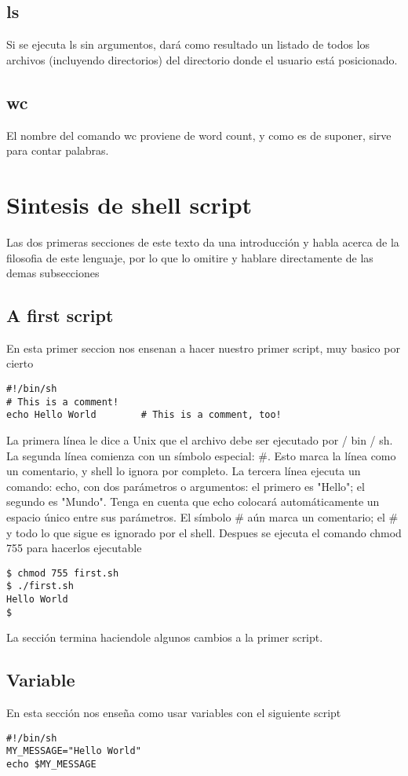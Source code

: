 \documentclass{article}
\begin{document}
\subsection{ls}
Si se ejecuta ls sin argumentos, dará como resultado un listado de todos los archivos (incluyendo directorios) del directorio donde el usuario está posicionado.
\subsection{wc}
El nombre del comando wc proviene de word count, y como es de suponer, sirve para contar palabras.


\section{Sintesis de shell script}
Las dos primeras secciones de este texto da una introducción y habla acerca de la filosofia de este lenguaje, por lo que lo omitire y hablare directamente de las demas subsecciones
\subsection{A first script}
En esta primer seccion nos ensenan a hacer nuestro primer script, muy basico por cierto
\begin{verbatim}
#!/bin/sh
# This is a comment!
echo Hello World        # This is a comment, too!
\end{verbatim}
La primera línea le dice a Unix que el archivo debe ser ejecutado por / bin / sh.
\newline
La segunda línea comienza con un símbolo especial: \#. Esto marca la línea como un comentario, y shell lo ignora por completo.
\newline
La tercera línea ejecuta un comando: echo, con dos parámetros o argumentos: el primero es "Hello"; el segundo es "Mundo".
Tenga en cuenta que echo colocará automáticamente un espacio único entre sus parámetros.
El símbolo \# aún marca un comentario; el \# y todo lo que sigue es ignorado por el shell.
\newline
Despues se ejecuta el comando chmod 755 para hacerlos ejecutable
\begin{verbatim}
$ chmod 755 first.sh
$ ./first.sh
Hello World
$
\end{verbatim}

La sección termina haciendole algunos cambios a la primer script.

\subsection{Variable}
En esta sección nos enseña como usar variables con el siguiente script
\begin{verbatim}
#!/bin/sh
MY_MESSAGE="Hello World"
echo $MY_MESSAGE
\end{verbatim}
\end{document}
